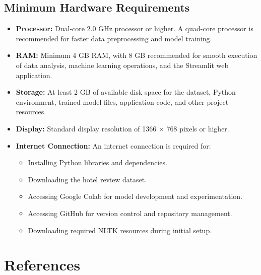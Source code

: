 \documentclass[12pt,a4paper]{report}
\begin{document}
\vspace{0.4cm}

\section{Minimum Hardware Requirements}

\begin{itemize}

    \item \textbf{Processor:}
    Dual-core 2.0 GHz processor or higher.
    A quad-core processor is recommended for faster
    data preprocessing and model training.

    \item \textbf{RAM:}
    Minimum 4 GB RAM, with 8 GB recommended
    for smooth execution of data analysis,
    machine learning operations, and the
    Streamlit web application.

    \item \textbf{Storage:}
    At least 2 GB of available disk space
    for the dataset, Python environment,
    trained model files, application code,
    and other project resources.

    \item \textbf{Display:}
    Standard display resolution of
    1366 $\times$ 768 pixels or higher.

    \item \textbf{Internet Connection:}
    An internet connection is required for:

    \begin{itemize}
        \item Installing Python libraries and dependencies.
        \item Downloading the hotel review dataset.
        \item Accessing Google Colab for model development
        and experimentation.
        \item Accessing GitHub for version control
        and repository management.
        \item Downloading required NLTK resources
        during initial setup.
    \end{itemize}

\end{itemize}


\newpage
\chapter{References}
\end{document}
